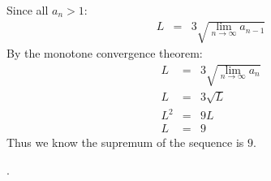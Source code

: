 \documentclass{myassignment}
\begin{document}
\begin{answer}
		Since all $a_n > 1$:\\
		\begin{eqnarray}
			L &=& 3\sqrt{ \lim_{n\rightarrow\infty} a_{n-1} }
		\end{eqnarray}
		By the monotone convergence theorem:
		\begin{eqnarray}
			L &=& 3\sqrt{ \lim_{n\rightarrow\infty} a_{n} }\\[1em]
			L &=& 3\sqrt{L}\\[1em]
			L^2 &=& 9L\\[1em]
			L &=& 9
		\end{eqnarray}
		Thus we know the supremum of the sequence is $9$.
	\end{answer}.
\end{document}
